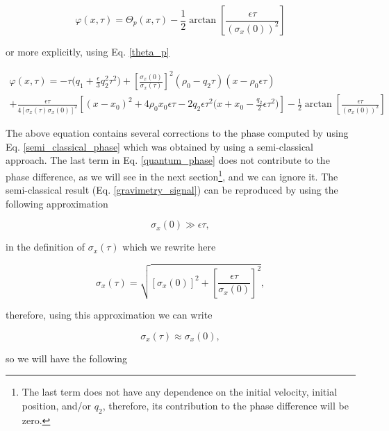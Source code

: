 \documentclass{article}
\begin{document}
\begin{equation}
\varphi(x, \tau) = \Theta_{p}(x, \tau) - \frac{1}{2}\arctan\left[\frac{\epsilon \tau}{(\sigma_{x}(0))^{2}}\right]
\end{equation}

or more explicitly, using Eq. \ref{theta_p}

\begin{multline}\label{quantum_phase}
\varphi(x, \tau) = -\tau \bigg(q_{1} + \frac{\epsilon}{3} q_{2}^{2} \tau^{2}\bigg) + \left[\frac{\sigma_{x}(0)}{\sigma_{x}(\tau)} \right]^{2} (\rho_{0} - q_{2} \tau)(x-\rho_{0} \epsilon \tau) \\
+ \frac{\epsilon \tau}{4 [\sigma_{x}(\tau)\sigma_{x}(0)]^{2}} \left[(x-x_{0})^{2} + 4\rho_{0} x_{0} \epsilon \tau -2q_{2} \epsilon \tau^{2} \bigg(x+x_{0}- \frac{q_{2}}{2} \epsilon \tau^{2} \bigg)\right] 
- \frac{1}{2}\arctan\left[\frac{\epsilon \tau}{(\sigma_{x}(0))^{2}}\right]
\end{multline}

The above equation contains several corrections to the phase computed by using Eq. \ref{semi_classical_phase} which was obtained by using a semi-classical approach. The last term in Eq. \ref{quantum_phase} does not contribute to the phase difference, as we will see in the next section\footnote{The last term does not have any dependence on the initial velocity, initial position, and/or $q_{2}$, therefore, its contribution to the phase difference will be zero.}, and we can ignore it. The semi-classical result (Eq. \ref{gravimetry_signal}) can be reproduced by using the following approximation

\begin{equation}\label{sigma_zero_approx}
\sigma_{x}(0) \gg \epsilon \tau,
\end{equation}

in the definition of $\sigma_{x}(\tau)$ which we rewrite here

\begin{equation*}
\sigma_{x}(\tau) = \sqrt{[\sigma_{x}(0)]^{2} + \left[\frac{\epsilon \tau}{\sigma_{x}(0)} \right]^{2}},
\end{equation*}

therefore, using this approximation we can write

\begin{equation*}
\sigma_{x}(\tau) \approx \sigma_{x}(0),
\end{equation*}

so we will have the following
\end{document}
